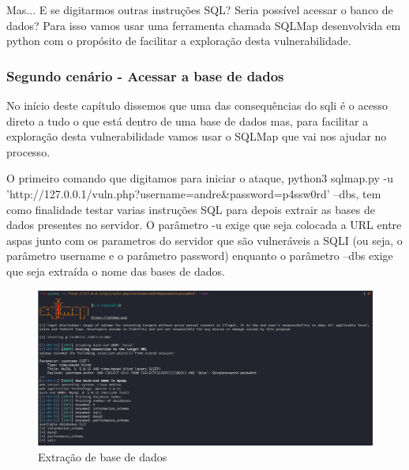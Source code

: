 \documentclass{report}
\begin{document}
Mas... E se digitarmos outras instruções SQL? Seria possível acessar o banco de dados? Para isso vamos usar uma ferramenta chamada SQLMap desenvolvida em python com o propósito de facilitar a exploração desta vulnerabilidade. 
\clearpage
\subsubsection{Segundo cenário - Acessar a base de dados}

No início deste capítulo dissemos que uma das consequências do \ac{sqli} é o acesso direto a tudo o que está dentro de uma base de dados mas, para facilitar a exploração desta vulnerabilidade vamos usar o SQLMap que vai nos ajudar no processo.\cite{sqlmapproject}

O primeiro comando que digitamos para iniciar o ataque, python3 sqlmap.py -u 'http://127.0.0.1/vuln.php?username=andre\&password=p4ssw0rd' --dbs, tem como finalidade testar varias instruções SQL para depois extrair as bases de dados presentes no servidor. O parâmetro -u exige que seja colocada a URL entre aspas junto com os parametros do servidor que são vulneráveis a SQLI (ou seja, o parâmetro username e o parâmetro password) enquanto o parâmetro --dbs exige que seja extraída o nome das bases de dados.
\begin{figure}[h]
 \centering
 \includegraphics[scale=0.25]{imagessql/Fig5.png}
 \caption{Extração de base de dados}
\end{figure}  
\end{document}
